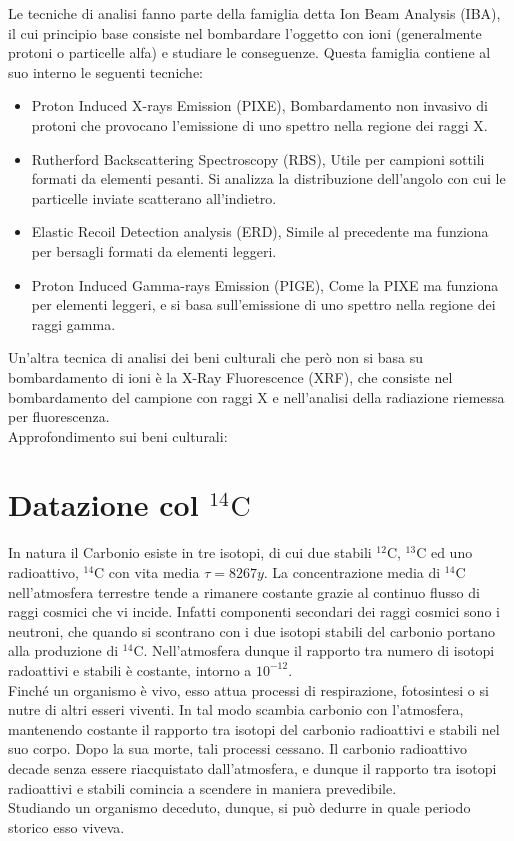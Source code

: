 \documentclass [a4paper, twoside] {book}
\begin{document}
Le tecniche di analisi fanno parte della famiglia detta Ion Beam Analysis (IBA), il cui principio base consiste nel bombardare l'oggetto con ioni (generalmente protoni o particelle alfa) e studiare le conseguenze. Questa famiglia contiene al suo interno le seguenti tecniche:
\begin{itemize}
\item Proton Induced X-rays Emission (PIXE), Bombardamento non invasivo di protoni che provocano l'emissione di uno spettro nella regione dei raggi X.
\item Rutherford Backscattering Spectroscopy (RBS), Utile per campioni sottili formati da elementi pesanti. Si analizza la distribuzione dell'angolo con cui le particelle inviate scatterano all'indietro.
\item Elastic Recoil Detection analysis (ERD), Simile al precedente ma funziona per bersagli formati da elementi leggeri.
\item Proton Induced Gamma-rays Emission (PIGE), Come la PIXE ma funziona per elementi leggeri, e si basa sull'emissione di uno spettro nella regione dei raggi gamma.
\end{itemize}

Un'altra tecnica di analisi dei beni culturali che però non si basa su bombardamento di ioni è la X-Ray Fluorescence (XRF), che consiste nel bombardamento del campione con raggi X e nell'analisi della radiazione riemessa per fluorescenza.\\

Approfondimento sui beni culturali: \cite{Cultural}


\section{Datazione col $^{14}\text{C}$}

In natura il Carbonio esiste in tre isotopi, di cui due stabili $^{12}\text{C}$, $^{13}\text{C}$ ed uno radioattivo, $^{14}\text{C}$ con vita media $\tau=8267y$.
La concentrazione media di $^{14}\text{C}$ nell'atmosfera terrestre tende a rimanere costante grazie al continuo flusso di raggi cosmici che vi incide. Infatti  componenti secondari dei raggi cosmici sono i neutroni, che quando si scontrano con i due isotopi stabili del carbonio portano alla produzione di $^{14}\text{C}$.
Nell'atmosfera dunque il rapporto tra numero di isotopi radoattivi e stabili è costante, intorno a $10^{-12}$. \\
Finché un organismo è vivo, esso attua processi di respirazione, fotosintesi o si nutre di altri esseri viventi. In tal modo scambia carbonio con l'atmosfera, mantenendo costante il rapporto tra isotopi del carbonio radioattivi e stabili nel suo corpo. Dopo la sua morte, tali processi cessano. Il carbonio radioattivo decade senza essere riacquistato dall'atmosfera, e dunque il rapporto tra isotopi radioattivi e stabili comincia a scendere in maniera prevedibile.\\
Studiando un organismo deceduto, dunque, si può dedurre in quale periodo storico esso viveva.
\end{document}
